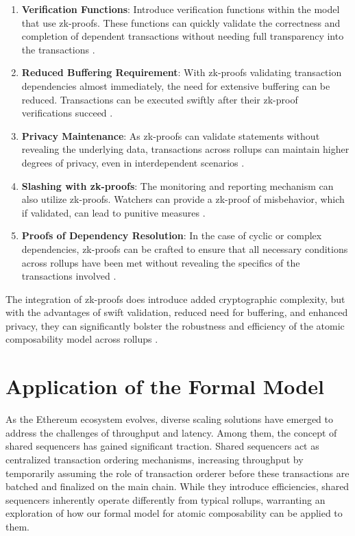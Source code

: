 \documentclass{article}
\begin{document}
\begin{enumerate}
\def\labelenumi{\arabic{enumi}.}
\item
  \textbf{Verification Functions}: Introduce verification functions
  within the model that use zk-proofs. These functions can quickly
  validate the correctness and completion of dependent transactions
  without needing full transparency into the transactions \cite{ben2018scalable}.
\item
  \textbf{Reduced Buffering Requirement}: With zk-proofs validating
  transaction dependencies almost immediately, the need for extensive
  buffering can be reduced. Transactions can be executed swiftly after
  their zk-proof verifications succeed \cite{bitansky2012extractable}.
\item
  \textbf{Privacy Maintenance}: As zk-proofs can validate statements
  without revealing the underlying data, transactions across rollups can
  maintain higher degrees of privacy, even in interdependent scenarios \cite{ben2013snarks}.
\item
  \textbf{Slashing with zk-proofs}: The monitoring and reporting
  mechanism can also utilize zk-proofs. Watchers can provide a zk-proof
  of misbehavior, which if validated, can lead to punitive measures \cite{wahby2019fast}.
\item
  \textbf{Proofs of Dependency Resolution}: In the case of cyclic or
  complex dependencies, zk-proofs can be crafted to ensure that all
  necessary conditions across rollups have been met without revealing
  the specifics of the transactions involved \cite{gennaro2013quadratic}.
\end{enumerate}

The integration of zk-proofs does introduce added cryptographic
complexity, but with the advantages of swift validation, reduced need
for buffering, and enhanced privacy, they can significantly bolster the
robustness and efficiency of the atomic composability model across
rollups \cite{williamson2020rollup}.


\section{Application of the Formal
Model}\label{application-of-the-formal-model}

As the Ethereum ecosystem evolves, diverse scaling solutions have
emerged to address the challenges of throughput and latency. Among them,
the concept of shared sequencers has gained significant traction. Shared
sequencers act as centralized transaction ordering mechanisms,
increasing throughput by temporarily assuming the role of transaction
orderer before these transactions are batched and finalized on the main
chain. While they introduce efficiencies, shared sequencers inherently
operate differently from typical rollups, warranting an exploration of
how our formal model for atomic composability can be applied to them.
\end{document}
